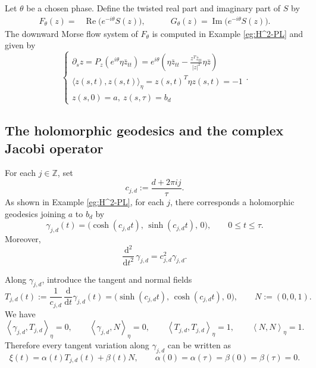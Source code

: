 \documentclass[11pt]{amsart}
\theoremstyle{plain}
\theoremstyle{definition}
\newcommand{\Z}{\mathbb Z}
\newcommand{\dd}{\mathrm d}
\newcommand{\ip}[2]{\left\langle #1,#2\right\rangle}
\DeclareMathOperator{\re}{Re}
\DeclareMathOperator{\im}{Im}
\begin{document}
Let $\theta$ be a chosen phase.  Define the twisted real part and imaginary part of $S$ by
\begin{align*}
F_{\theta}(z)=&\re\bigl(e^{-i\theta}S(z)\bigr),
\qquad\quad
G_{\theta}(z)=\im\bigl(e^{-i\theta}S(z)\bigr).    
\end{align*}
The downward Morse flow system of $F_{\theta}$ is computed in Example \ref{eg:H^2-PL} and given by
\begin{equation}\label{eq:flow}
\begin{cases}
\partial_sz=P_z(e^{i\theta}\eta \bar{z}_{tt})=e^{i\theta}\left(\eta\bar{z}_{tt}-\frac{z^T\bar{z}_{tt}}{|z|^2}\eta\bar{z}\right)\\[0.1cm]
\langle z(s,t),z(s,t)\rangle_{\eta}=z(s,t)^T\eta z(s,t)=-1\\[0.1cm]
z(s,0)=a,~z(s,\tau)=b_d
\end{cases}.
\end{equation}









\subsection{The holomorphic geodesics and the complex Jacobi operator}

For each $j\in\Z$, set
\[
c_{j,d}:=\frac{d+2\pi i j}{\tau}.
\]
As shown in Example \ref{eg:H^2-PL}, for each $j$, there corresponds a holomorphic geodesics joining $a$ to $b_d$ by  
\begin{equation}\label{eq:gammajd}
\gamma_{j,d}(t)=\bigl(\cosh(c_{j,d}t),\,\sinh(c_{j,d}t),\,0\bigr),
\qquad 0\le t\le \tau.
\end{equation}
Moreover,
\[
\frac{\dd^2}{\dd t^2}\,\gamma_{j,d}=c_{j,d}^2\gamma_{j,d}.
\]

Along $\gamma_{j,d}$, introduce the tangent and normal fields
\[
T_{j,d}(t):=\frac1{c_{j,d}}\,\frac{\dd}{\dd t}\gamma_{j,d}(t)
=\bigl(\sinh(c_{j,d}t),\,\cosh(c_{j,d}t),\,0\bigr),
\qquad
N:=(0,0,1).
\]
We have
\[
\ip{\gamma_{j,d}}{T_{j,d}}_{\eta}=0,
\qquad
\ip{\gamma_{j,d}}{N}_{\eta}=0,
\qquad
\ip{T_{j,d}}{T_{j,d}}_{\eta}=1,
\qquad
\ip{N}{N}_{\eta}=1.
\]
Therefore every tangent variation along $\gamma_{j,d}$ can be written as
\[
\xi(t)=\alpha(t)T_{j,d}(t)+\beta(t)N,
\qquad
\alpha(0)=\alpha(\tau)=\beta(0)=\beta(\tau)=0.
\]
\end{document}
